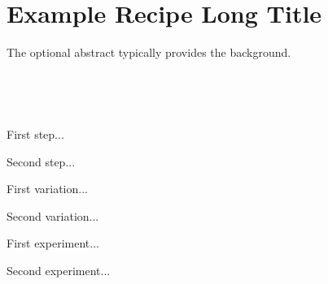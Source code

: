 \section[Example Recipe]{Example Recipe Long Title}

\begin{recipestats}[
	servings=no. of servings,
	preptime=preparation time,
	bakingtime=cooking time,
	source=source or inspiration,
]
\end{recipestats}


\begin{recipeabstract}
	The optional abstract typically provides the background.
\end{recipeabstract}

\begin{ingredientcolumns}
	\begin{ingredientblock}
		\\
	\end{ingredientblock}
	\begin{ingredientblock}
		\\
	\end{ingredientblock}
\end{ingredientcolumns}


\begin{preparation}
	\item First step...
	\item Second step...
\end{preparation}

\begin{variation}
	\item First variation...
	\item Second variation...
\end{variation}

\begin{experiments}
	\item First experiment...
	\item Second experiment...
\end{experiments}

\recipeend